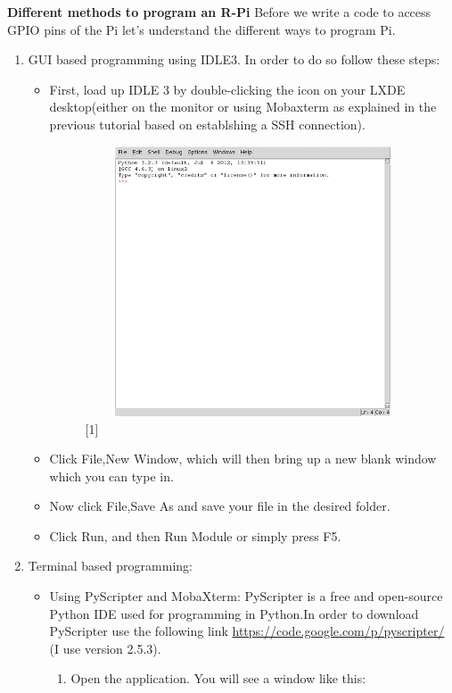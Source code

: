 \documentclass[11pt,a4paper]{article}
\begin{document}
	\newpage
	\textbf{Different methods to program an R-Pi}
	\newline
	Before we write a code to access GPIO pins of the Pi let's understand the different ways to program Pi.
	\begin{enumerate}
		\item GUI based programming using IDLE3. In order to do so follow these steps:
		\begin{itemize}
			\item First, load up IDLE 3 by double-clicking the icon on your LXDE desktop(either on the monitor or using Mobaxterm as explained in the previous tutorial based on establshing a SSH connection).
			\begin{figure}[h!]
				\includegraphics[width=10cm, height=8cm]{idle3.png}
				\centering
				\caption{[1]}
			\end{figure}
			\item Click File,New Window, which will then bring up a new blank window which you can type in.
			\item Now click File,Save As and save your file in the desired folder.
			\item Click Run, and then Run Module or simply press F5.
		\end{itemize}
		\item Terminal based programming:
		\begin{itemize}
			\item Using PyScripter and MobaXterm:
			PyScripter is a free and open-source Python IDE used for programming in Python.In order to download PyScripter use the following link \url{https://code.google.com/p/pyscripter/} (I use version 2.5.3).
			\newline \begin{enumerate}
				\item Open the application. You will see a window like this:

\end{enumerate}
\end{itemize}
\end{enumerate}
\end{document}
